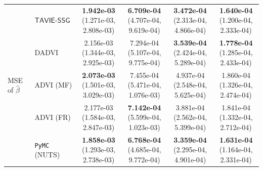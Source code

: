 \documentclass[12pt]{article}
\numberwithin{equation}{section}
\newcommand{\tssg}{\mathsf{TAVIE}\text{-}\mathsf{SSG}}
\begin{document}
{\begin{longtable}{llcccc}
\multirow{5}{*}{MSE of $\widehat{\beta}$}
& $\tssg$ & \makecell[c]{\textbf{1.942e-03}\\(1.271e-03, 2.808e-03)} & \makecell[c]{\textbf{6.709e-04}\\(4.707e-04, 9.619e-04)} & \makecell[c]{\textbf{3.472e-04}\\(2.313e-04, 4.866e-04)} & \makecell[c]{\textbf{1.640e-04}\\(1.200e-04, 2.333e-04)} \\
& DADVI & \makecell[c]{2.156e-03\\(1.344e-03, 2.925e-03)} & \makecell[c]{7.294e-04\\(5.107e-04, 9.775e-04)} & \makecell[c]{\textbf{3.539e-04}\\(2.424e-04, 5.289e-04)} & \makecell[c]{\textbf{1.778e-04}\\(1.285e-04, 2.433e-04)} \\
& ADVI (MF) & \makecell[c]{\textbf{2.073e-03}\\(1.501e-03, 3.029e-03)} & \makecell[c]{7.455e-04\\(5.471e-04, 1.076e-03)} & \makecell[c]{4.937e-04\\(2.548e-04, 5.625e-04)} & \makecell[c]{1.860e-04\\(1.326e-04, 2.474e-04)} \\
& ADVI (FR) & \makecell[c]{2.177e-03\\(1.584e-03, 2.847e-03)} & \makecell[c]{\textbf{7.142e-04}\\(5.599e-04, 1.023e-03)} & \makecell[c]{3.881e-04\\(2.562e-04, 5.399e-04)} & \makecell[c]{1.841e-04\\(1.332e-04, 2.712e-04)} \\
& \texttt{PyMC} (NUTS) & \makecell[c]{\textbf{1.858e-03}\\(1.293e-03, 2.738e-03)} & \makecell[c]{\textbf{6.768e-04}\\(4.685e-04, 9.772e-04)} & \makecell[c]{\textbf{3.359e-04}\\(2.295e-04, 4.901e-04)} & \makecell[c]{\textbf{1.631e-04}\\(1.164e-04, 2.331e-04)} \\
\hline


\end{longtable}}
\end{document}
